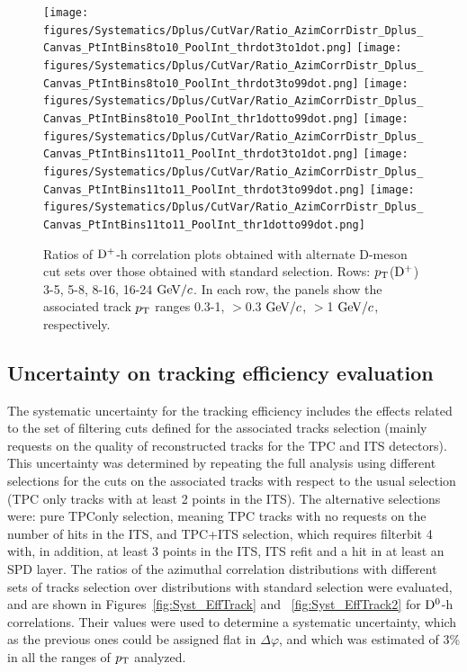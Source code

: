 \begin{figure}
{\texttt{[image: figures/Systematics/Dplus/CutVar/Ratio\_AzimCorrDistr\_Dplus\_Canvas\_PtIntBins8to10\_PoolInt\_thrdot3to1dot.png]}}
{\texttt{[image: figures/Systematics/Dplus/CutVar/Ratio\_AzimCorrDistr\_Dplus\_Canvas\_PtIntBins8to10\_PoolInt\_thrdot3to99dot.png]}}
{\texttt{[image: figures/Systematics/Dplus/CutVar/Ratio\_AzimCorrDistr\_Dplus\_Canvas\_PtIntBins8to10\_PoolInt\_thr1dotto99dot.png]}}
{\texttt{[image: figures/Systematics/Dplus/CutVar/Ratio\_AzimCorrDistr\_Dplus\_Canvas\_PtIntBins11to11\_PoolInt\_thrdot3to1dot.png]}}
{\texttt{[image: figures/Systematics/Dplus/CutVar/Ratio\_AzimCorrDistr\_Dplus\_Canvas\_PtIntBins11to11\_PoolInt\_thrdot3to99dot.png]}}
{\texttt{[image: figures/Systematics/Dplus/CutVar/Ratio\_AzimCorrDistr\_Dplus\_Canvas\_PtIntBins11to11\_PoolInt\_thr1dotto99dot.png]}}
 \caption{Ratios of ${\rm D^+}$-h correlation plots obtained with alternate D-meson cut sets over those obtained with standard selection. Rows: $p_{\rm T}$(${\rm D^+}$) 3-5, 5-8, 8-16, 16-24 $\mathrm{GeV}/c$. In each row, the panels show the associated track $p_{\rm T}$ ranges 0.3-1, $>$0.3 $\mathrm{GeV}/c$,  $>$1 $\mathrm{GeV}/c$, respectively.}
\label{fig:Syst_DplusCutVar}
\end{figure}



\subsection{Uncertainty on tracking efficiency evaluation}
The systematic uncertainty for the tracking efficiency includes the effects related to the set of filtering cuts defined for the associated tracks selection (mainly requests on the quality of reconstructed tracks for the TPC and ITS detectors). This uncertainty was determined by repeating the full analysis using different selections for the cuts on the associated tracks with respect to the usual selection (TPC only tracks with at least 2 points in the ITS). The alternative selections were: pure TPConly selection, meaning TPC tracks with no requests on the number of hits in the ITS, and TPC+ITS selection, which requires filterbit 4 with, in addition, at least 3 points in the ITS, ITS refit and a hit in at least an SPD layer. The ratios of the azimuthal correlation distributions with different sets of tracks selection over distributions with standard selection were evaluated, and are shown in Figures~\ref{fig:Syst_EffTrack} and ~\ref{fig:Syst_EffTrack2} for ${\rm D^0}$-h correlations. Their values were used to determine a systematic uncertainty, which as the previous ones could be assigned flat in $\Delta\varphi$, and which was estimated of 3\% in all the ranges of $p_{\rm T}$ analyzed.

